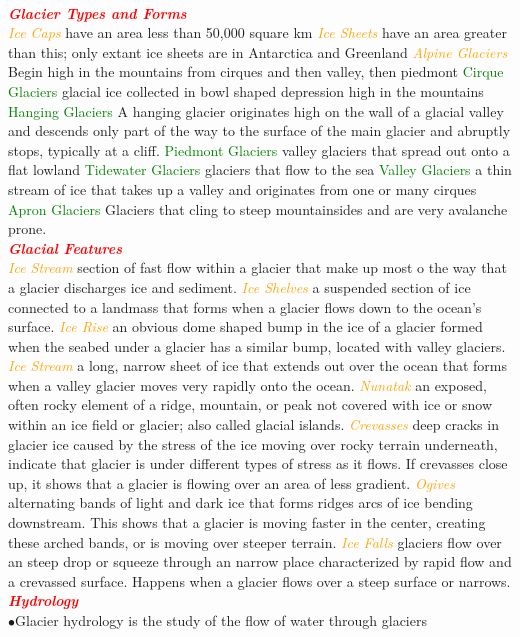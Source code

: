 \documentclass{article}
\newcommand{\ddd}{$\bullet$}
\newcommand{\red}[1]{\textcolor{red}{#1}}
\newcommand{\green}[1]{\textcolor{green}{#1}}
\newcommand{\orange}[1]{\textcolor{orange}{#1}}
\newcommand{\mysection}[1]{\\ \textbf{\textit{\red{#1}}} \\}
\newcommand{\mysub}[1]{{\textit{\orange{#1}}}}
\newcommand{\mysubsub}[1]{{{\green{#1}}}}
\begin{document}
\begin{multicols*}{4}
		\mysection{Glacier Types and Forms}
		\mysub{Ice Caps} have an area less than 50,000 square km
		\mysub{Ice Sheets} have an area greater than this; only extant ice sheets are in Antarctica and Greenland
		\mysub{Alpine Glaciers} Begin high in the mountains from cirques and then valley, then piedmont
		\mysubsub{Cirque Glaciers} glacial ice collected in bowl shaped depression high in the mountains 
		\mysubsub{Hanging Glaciers}  A hanging glacier originates high on the wall of a glacial valley and descends only part of the way to the surface of the main glacier and abruptly stops, typically at a cliff.
		\mysubsub{Piedmont Glaciers} valley glaciers that spread out onto a flat lowland
		\mysubsub{Tidewater Glaciers} glaciers that flow to the sea
		\mysubsub{Valley Glaciers} a thin stream of ice that takes up a valley and originates from one or many cirques
		\mysubsub{Apron Glaciers} Glaciers that cling to steep mountainsides and are very avalanche prone.
	    \mysection{Glacial Features}  
	    \mysub{Ice Stream} section of fast flow within a glacier that make up most o the way that a glacier discharges ice and sediment.
		\mysub{Ice Shelves} a suspended section of ice connected to a landmass that forms when a glacier flows down to the ocean’s surface.
		\mysub{Ice Rise} an obvious dome shaped bump in the ice of a glacier formed when the seabed under a glacier has a similar bump, located with valley glaciers.
		\mysub{Ice Stream} a long, narrow sheet of ice that extends out over the ocean that forms when a valley glacier moves very rapidly onto the ocean.
		\mysub{Nunatak} an exposed, often rocky element of a ridge, mountain, or peak not covered with ice or snow within an ice field or glacier; also called glacial islands.
		\mysub{Crevasses} deep cracks in glacier ice caused by the stress of the ice moving over rocky terrain underneath, indicate that glacier is under different types of stress as it flows. If crevasses close up, it shows that a glacier is flowing over an area of less gradient. 
		\mysub{Ogives} alternating bands of light and dark ice that forms ridges arcs of ice bending downstream. This shows that a glacier is moving faster in the center, creating these arched bands, or is moving over steeper terrain.
		\mysub{Ice Falls} glaciers flow over an steep drop or squeeze through an narrow place characterized by rapid flow and a crevassed surface. Happens when a glacier flows over a steep surface or narrows.
	    \mysection{Hydrology}
	        \ddd Glacier hydrology is the study of the flow of water through glaciers

\end{multicols*}
\end{document}

